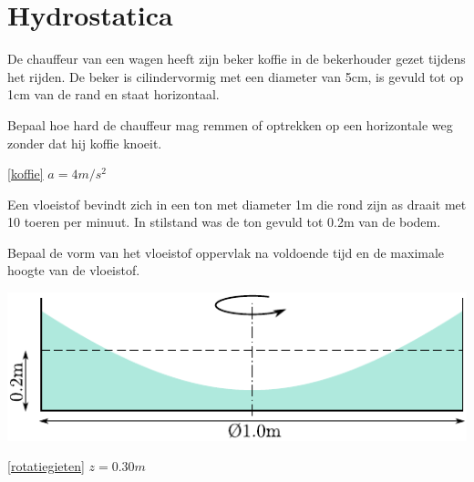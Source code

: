 \chapter{Hydrostatica}
\label{sec:Hydrostatica}
\begin{toepassing}
	\label{koffie}
De chauffeur van een wagen heeft zijn beker koffie in de bekerhouder gezet tijdens het rijden. De beker is cilindervormig met een diameter van 5cm, is gevuld tot op 1cm van de rand en staat horizontaal.
		
Bepaal hoe hard de chauffeur mag remmen of optrekken op een horizontale weg zonder dat hij koffie knoeit.
\end{toepassing}
\begin{antwoord}{\ref{koffie}}
	$a = 4\unit{m/s^2}$
\end{antwoord}
\vfill
\begin{toepassing}
	\label{rotatiegieten}
Een vloeistof bevindt zich in een ton met diameter 1m die rond zijn as draait met 10 toeren per minuut. In stilstand was de ton gevuld tot 0.2m van de bodem. 
		
Bepaal de vorm van het vloeistof oppervlak na voldoende tijd en de maximale hoogte van de vloeistof.

	\centering
	\includegraphics{fig/hydrostatica/rotatiegieten}
\end{toepassing}
\begin{antwoord}{\ref{rotatiegieten}}
	$z = 0.30\unit{m}$ 
\end{antwoord}
